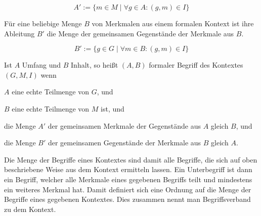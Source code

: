 \documentclass[pagesize,paper=A4,DIV=calc,fontsize=12pt,draft=false]{scrreprt}
\begin{document}
\begin{equation*}
A' := \lbrace m \in M \; \vert \; \forall g \in A: (g,m) \in I\rbrace
\end{equation*}

Für eine beliebige Menge $B$ von Merkmalen aus einem formalen Kontext ist ihre Ableitung $B'$ die Menge der gemeinsamen Gegenstände der Merkmale aus $B$. 

\begin{equation*}
B' := \lbrace g \in G \; \vert \; \forall m \in B: (g,m) \in I\rbrace
\end{equation*}

Ist $A$ Umfang und $B$ Inhalt, so heißt $(A,B)$ formaler Begriff des Kontextes $(G,M,I)$ wenn

\begin{inparaenum}
\item
 $A$ eine echte Teilmenge von $G$, und
\item
 $B$ eine echte Teilmenge von $M$ ist, und
\item
 die Menge $A'$ der gemeinsamen Merkmale der Gegenstände aus $A$ gleich
 $B$, und
\item
 die Menge $B'$ der gemeinsamen Gegenstände der Merkmale aus $B$ gleich
 $A$.
\end{inparaenum}

Die Menge der Begriffe eines Kontextes sind damit alle Begriffe, die sich auf oben beschriebene Weise aus dem Kontext ermitteln lassen. 
Ein Unterbegriff ist dann ein Begriff, welcher alle Merkmale eines gegebenen Begriffs teilt und mindestens ein weiteres Merkmal hat. 
Damit definiert sich eine Ordnung auf die Menge der Begriffe eines gegebenen Kontextes. 
Dies zusammen nennt man Begriffsverband zu dem Kontext. 
\end{document}

